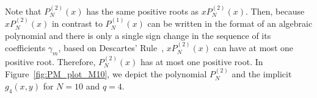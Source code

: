 \documentclass[journal,12pt,onecolumn,draftclsnofoot]{IEEEtran}
\theoremstyle{definition}
\begin{document}
Note that $P^{(2)}_{N}(x)$ has the same positive roots as $xP^{(2)}_{N}(x)$. Then, because $xP^{(2)}_{N}(x)$  in contrast to $P_{N}^{(1)}(x)$  can be written in the format of an algebraic polynomial and there is only a single sign change in the sequence of its coefficients $\gamma_m$,  based on Descartes’ Rule~\cite{anderson1998descartes}, $xP^{(2)}_{N}(x)$ can have at most one positive root.  Therefore, $P^{(2)}_{N}(x)$ has at most one positive root. In Figure~\ref{fig:PM_plot_M10}, we depict the polynomial  $P^{(2)}_{N}$ and the implicit $g_4(x,y)$ for $N=10$ and $q=4$.









% 

\end{document}
